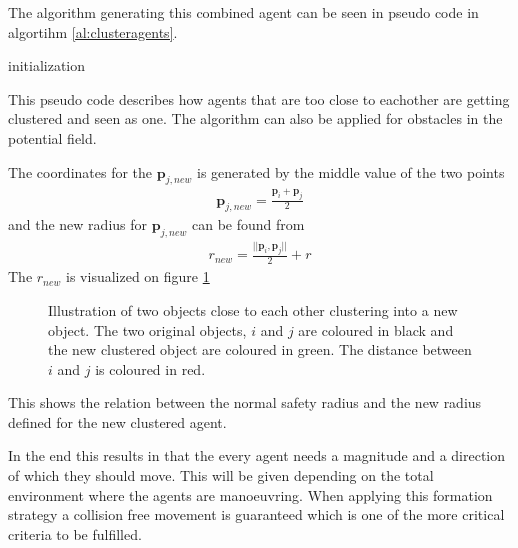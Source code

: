 The algorithm generating this combined agent can be seen in pseudo code in algortihm \ref{al:clusteragents}.
\begin{algorithm}[H]
  initialization\;
  \caption{This pseudo code describes how agents that are too close to eachother are getting clustered and seen as one. The algorithm can also be applied for obstacles in the potential field.}
  \label{al:clusteragents}
\end{algorithm}
The coordinates for the $\mathbf{p}_{j,new}$ is generated by the middle value of the two points
\begin{align}
\mathbf{p}_{j,new} = \frac{\mathbf{p}_i + \mathbf{p}_j}{2}
\end{align}
and the new radius for $\mathbf{p}_{j,new}$ can be found from
\begin{align}
r_{new} = \frac{||\mathbf{p}_i , \mathbf{p}_j||}{2} + r
\end{align}
The $r_{new}$ is visualized on figure \ref{fig:rnew}
\begin{figure}[htbp]
\centering

\caption{Illustration of two objects close to each other clustering into a new object. The two original objects, $i$ and $j$ are coloured in black and the new clustered object are coloured in green. The distance between $i$ and $j$ is coloured in red.}
\label{fig:rnew}
\end{figure}
This shows the relation between the normal safety radius and the new radius defined for the new clustered agent.

In the end this results in that the every agent needs a magnitude and
a direction of which they should move. This will be given depending on
the total environment where the agents are manoeuvring. When applying
this formation strategy a collision free movement is guaranteed which
is one of the more critical criteria to be fulfilled. 




